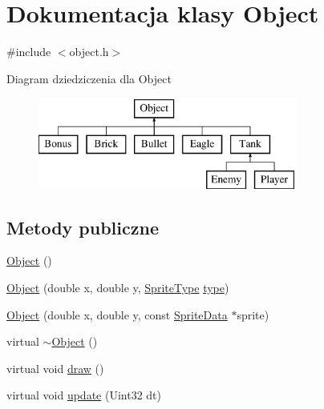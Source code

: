 \hypertarget{class_object}{}\section{Dokumentacja klasy Object}
\label{class_object}


{\ttfamily \#include $<$object.\+h$>$}

Diagram dziedziczenia dla Object\begin{figure}[H]
\begin{center}
\leavevmode
\includegraphics[height=3.000000cm]{class_object}
\end{center}
\end{figure}
\subsection*{Metody publiczne}
\begin{DoxyCompactItemize}
\item 
\hyperlink{class_object_a40860402e64d8008fb42329df7097cdb}{Object} ()
\item 
\hyperlink{class_object_aaf2083b10a26fc519b5a2bb79aaf6986}{Object} (double x, double y, \hyperlink{type_8h_ac6fa10729dffeb6a192492f13c25e31a}{Sprite\+Type} \hyperlink{class_object_a1b89f32cd9e0040f8a2455f3cef7d0d2}{type})
\item 
\hyperlink{class_object_a8738ecc2b99c528875cf98787ceff25b}{Object} (double x, double y, const \hyperlink{struct_sprite_data}{Sprite\+Data} $\ast$sprite)
\item 
virtual \hyperlink{class_object_ae8f5483f459e46687bd01e6f9977afd3}{$\sim$\+Object} ()
\item 
virtual void \hyperlink{class_object_a821f5b25b450fa1acdb3f9c0b5962592}{draw} ()
\item 
virtual void \hyperlink{class_object_a02c1621329cb9ec5268072a2402d2ac5}{update} (Uint32 dt)
\end{DoxyCompactItemize}
